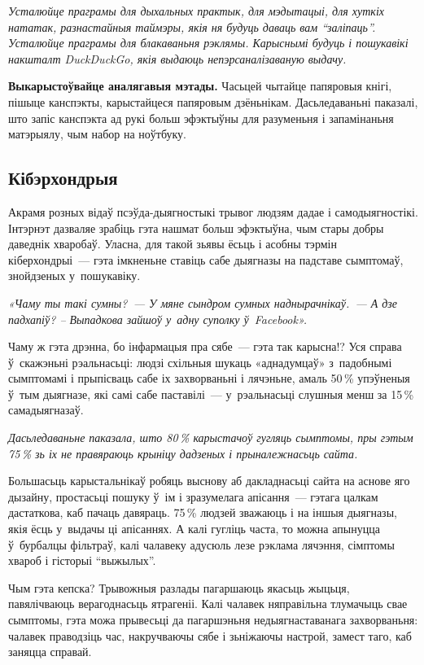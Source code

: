 \emph{Усталюйце праграмы для дыхальных практык, для мэдытацыі, для хуткіх нататак, разнастайныя таймэры, якія ня будуць даваць вам ``заліпаць''. Усталюйце праграмы для блакаваньня рэклямы. Карыснымі будуць і пошукавікі накшталт DuckDuckGo, якія выдаюць непэрсаналізаваную выдачу.}

\textbf{Выкарыстоўвайце аналягавыя мэтады.} Часьцей чытайце папяровыя кнігі, пішыце канспэкты, карыстайцеся папяровым дзёньнікам. Дасьледаваньні паказалі, што запіс канспэкта ад рукі больш эфэктыўны для разуменьня і запамінаньня матэрыялу, чым набор на ноўтбуку.

\subsection*{Кібэрхондрыя}

Акрамя розных відаў псэўда-дыягностыкі трывог людзям дадае і самодыягностікі. Інтэрнэт дазваляе зрабіць гэта нашмат больш эфэктыўна, чым стары добры даведнік хваробаў. Уласна, для такой зьявы ёсьць і асобны тэрмін кіберхондрыі~--- гэта імкненьне ставіць сабе дыягназы на падставе сымптомаў, знойдзеных у~пошукавіку.

\emph{«Чаму ты такі сумны?~--- У мяне сындром сумных наднырачнікаў.~--- А дзе падхапіў? -- Выпадкова зайшоў у~адну суполку ў~Facebook».} 

Чаму ж гэта дрэнна, бо інфармацыя пра сябе~--- гэта так карысна!? Уся справа ў~скажэньні рэальнасьці: людзі схільныя шукаць «аднадумцаў» з~падобнымі сымптомамі і прыпісваць сабе іх захворваньні і лячэньне, амаль 50\,\% упэўненыя ў~тым дыягназе, які самі сабе паставілі~--- у~рэальнасьці слушныя менш за 15\,\% самадыягназаў.

\emph{Дасьледаваньне паказала, што 80\,\% карыстачоў гугляць сымптомы, пры гэтым 75\,\% зь іх не правяраюць крыніцу дадзеных і прыналежнасьць сайта.}

Большасьць карыстальнікаў робяць выснову аб дакладнасьці сайта на аснове яго дызайну, простасьці пошуку ў~ім і зразумелага апісання~--- гэтага цалкам дастаткова, каб пачаць давяраць. 75\,\% людзей зважаюць і на іншыя дыягназы, якія ёсць у~выдачы ці апісаннях. А калі гугліць часта, то можна апынуцца ў~бурбалцы фільтраў, калі чалавеку адусюль лезе рэклама лячэння, сімптомы хвароб і гісторыі ``выжылых''.


Чым гэта кепска? Трывожныя разлады пагаршаюць якасьць жыцьця, павялічваюць верагоднасьць ятрагеніі. Калі чалавек няправільна тлумачыць свае сымптомы, гэта можа прывесьці да пагаршэньня недыягнаставанага захворваньня: чалавек праводзіць час, накручваючы сябе і зьніжаючы настрой, замест таго, каб заняцца справай. 

